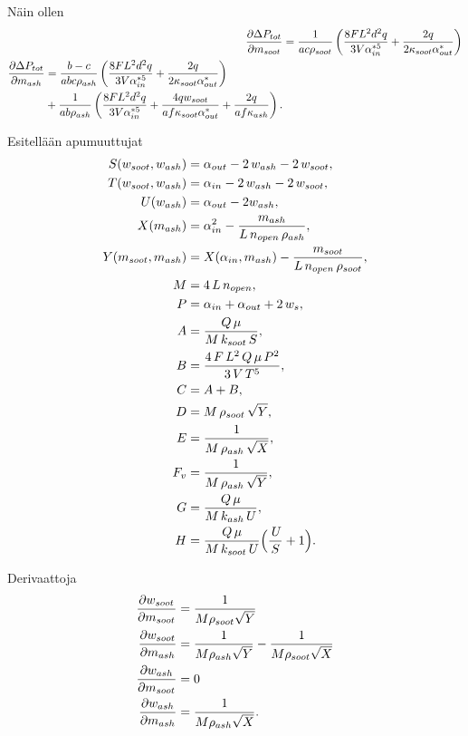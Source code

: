 Näin ollen 
\begin{align}
    \frac{\partial \Delta P_{tot}}{\partial m_{soot}} &=
     \frac{1}{ac\rho_{soot}}
    \left(\frac{8 F L^2 d^2 q}{3 V \alpha_{in}^{*5}} +
     \frac{2 q}{2 \kappa_{soot} \alpha_{out}^*}
    \right)\\
\begin{split}
    \frac{\partial \Delta P_{tot}}{\partial m_{ash}} &=
    \frac{b-c}{abc\rho_{ash}}\left(\frac{8 F L^2 d^2 q}{3 V \alpha_{in}^{*5}} +
     \frac{2 q}{2 \kappa_{soot} \alpha_{out}^*}
    \right) \\
    & + 
    \frac{1}{ab\rho_{ash}} \left(
        \frac{8 F L^2 d^2 q}{3 V \alpha_{in}^{*5}} +
        \frac{4qw_{soot}}{a f \kappa_{soot} \alpha_{out}^*  } +
        \frac{2q}{a f \kappa_{ash}  }
    \right).
\end{split}
\end{align}
\newpage


Esitellään apumuuttujat
\begin{align*}
S(w_{{soot}}, w_{{ash}}) &=\alpha_{{out}}-2\,w_{{ash}}-2\,w_{{soot}},\\
T(w_{{soot}}, w_{{ash}}) &=\alpha_{{in}}-2\,w_{{ash}}-2\,w_{{soot}},\\
U(w_{ash}) &=  \alpha_{out} - 2w_{ash}, \\
X(m_{{ash}})            &=\alpha_{{in}}^2 -\frac{m_{{ash}}}{L\,n_{{open}}\,\rho_{{ash}}},\\
Y(m_{{soot}}, m_{{ash}}) &=X(\alpha_{{in}},m_{{ash}})
        -\frac{m_{{soot}}}{L\,n_{{open}}\,\rho_{{soot}}},\\ 
M &=4\,L\,n_{{open}},\\
P &=\alpha_{{in}}+\alpha_{{out}}+2\,w_s,\\
A &=\frac{Q\,\mu}{M\,k_{{soot}}\,S},\\
B &= \frac{4\,F\,L^2\,Q\,\mu\,P^2}{3\,V\,T^5},\\
C &= A + B,\\
D &=M\,\rho_{{soot}}\,\sqrt{Y},\\
E &=\frac{1}{M\,\rho_{{ash}}\,\sqrt{X}},\\
F_v &= \frac{1}{M\,\rho_{{ash}}\,\sqrt{Y}},\\
G &=\frac{Q\,\mu}{M\,k_{ash}\,U},\\
H &=\frac{Q\,\mu}{M\,k_{soot}\,U}
      \Bigl(\frac{\,U}{S}+1\Bigr).
\end{align*}

Derivaattoja
\begin{align}
    \frac{\partial w_{soot}}{\partial m_{soot}} &= \frac{1}{M \rho_{soot}\sqrt{Y}} \\
    \frac{\partial w_{soot}}{\partial m_{ash}} &= \frac{1}{M\rho_{ash}\sqrt{Y}} - \frac{1}{M\rho_{soot}\sqrt{X}} \\
    \frac{\partial w_{ash}}{\partial m_{soot}}&=0\\
    \frac{\partial w_{ash}}{\partial m_{ash}} &= \frac{1}{M \rho_{ash}\sqrt{X}}.
\end{align}

